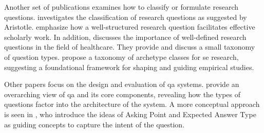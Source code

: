 Another set of publications examines how to classify or formulate research questions. \textcite{dillon_classification_1984} investigates the classification of research questions as suggested by Aristotle. \textcite{ratan_formulation_2019}  emphasize how a well-structured research question facilitates effective scholarly work. In addition, \textcite{kamper_types_2020} discusses the importance of well-defined research questions in the field of healthcare. They provide and discuss a small taxonomy of question types. \textcite{sjoberg_future_2007} propose a taxonomy of archetype classes for \gls{se} research, suggesting a foundational framework for shaping and guiding empirical studies.

Other papers focus on the design and evaluation of \gls{qa} systems. \textcite{allam_question_2016} provide an overarching view of \gls{qa} and its core components, revealing how the types of questions factor into the architecture of the system. A more conceptual approach is seen in \textcite{mikhailian_learning_2009}, who introduce the ideas of Asking Point and Expected Answer Type as guiding concepts to capture the intent of the question. 